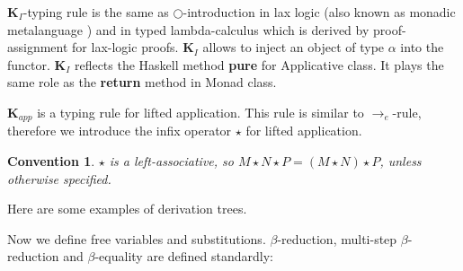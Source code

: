 \documentclass[a4paper]{article}
\newtheorem{con}{Convention}
\begin{document}
  $\textbf{K}_I$-typing rule is the same as $\bigcirc$-introduction in lax logic (also known as monadic
  metalanguage \cite{Lax}) and in typed lambda-calculus which is derived by proof-assignment for lax-logic
  proofs.
  $\textbf{K}_I$ allows to inject an object of type $\alpha$ into the functor. $\textbf{K}_I$  reflects the
  Haskell method {\bf pure} for Applicative class. It plays the same role as the {\bf return} method in Monad class.

  $\textbf{K}_{app}$ is a typing rule for lifted application. This rule is similar to
  $\rightarrow_e$-rule, therefore we introduce the infix operator $\star$ for lifted application.

  \begin{con}

  \emph{$\star$ is a left-associative, so $M \star N \star P = (M \star N) \star P$,  unless otherwise specified.}

  \end{con}

  \vspace{\baselineskip}

Here are some examples of derivation trees.

  \begin{prooftree}
  \end{prooftree}


  \begin{prooftree}
  \end{prooftree}




  \vspace{\baselineskip}

  Now we define free variables and substitutions. $\beta$-reduction, multi-step $\beta$-reduction and $\beta$-equality are defined standardly:
\end{document}
